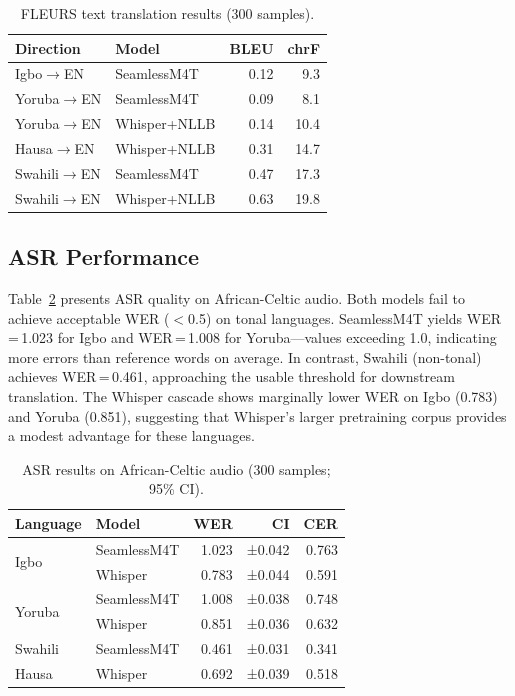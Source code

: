 \documentclass[11pt,a4paper]{article}
\newcommand{\dataAC}{African-Celtic}
\newcommand{\dataFL}{FLEURS}
\begin{document}
\begin{table}[t]
\centering
\small
\caption{\dataFL{} text translation results (300 samples).}
\label{tab:fleurs_text}
\begin{tabular}{llrr}
\toprule
\textbf{Direction} & \textbf{Model} & \textbf{BLEU} & \textbf{chrF} \\
\midrule
Igbo$\to$EN    & SeamlessM4T  & 0.12 & 9.3 \\
Yoruba$\to$EN  & SeamlessM4T  & 0.09 & 8.1 \\
Yoruba$\to$EN  & Whisper+NLLB & 0.14 & 10.4 \\
Hausa$\to$EN   & Whisper+NLLB & 0.31 & 14.7 \\
Swahili$\to$EN & SeamlessM4T  & 0.47 & 17.3 \\
Swahili$\to$EN & Whisper+NLLB & 0.63 & 19.8 \\
\bottomrule
\end{tabular}
\end{table}

\subsection{ASR Performance}

Table~\ref{tab:asr} presents ASR quality on \dataAC{} audio. Both models fail to achieve acceptable WER ($<$0.5) on tonal languages. SeamlessM4T yields WER\,=\,1.023 for Igbo and WER\,=\,1.008 for Yoruba—values exceeding 1.0, indicating more errors than reference words on average. In contrast, Swahili (non-tonal) achieves WER\,=\,0.461, approaching the usable threshold for downstream translation. The Whisper cascade shows marginally lower WER on Igbo (0.783) and Yoruba (0.851), suggesting that Whisper's larger pretraining corpus provides a modest advantage for these languages.

\begin{table}[t]
\centering
\small
\caption{ASR results on \dataAC{} audio (300 samples; 95\% CI).}
\label{tab:asr}
\begin{tabular}{llrrr}
\toprule
\textbf{Language} & \textbf{Model} & \textbf{WER} & \textbf{CI} & \textbf{CER} \\
\midrule
\multirow{2}{*}{Igbo}
  & SeamlessM4T  & 1.023 & ±0.042 & 0.763 \\
  & Whisper      & 0.783 & ±0.044 & 0.591 \\
\midrule
\multirow{2}{*}{Yoruba}
  & SeamlessM4T  & 1.008 & ±0.038 & 0.748 \\
  & Whisper      & 0.851 & ±0.036 & 0.632 \\
\midrule
Swahili & SeamlessM4T & 0.461 & ±0.031 & 0.341 \\
Hausa   & Whisper     & 0.692 & ±0.039 & 0.518 \\
\bottomrule
\end{tabular}
\end{table}
\end{document}
